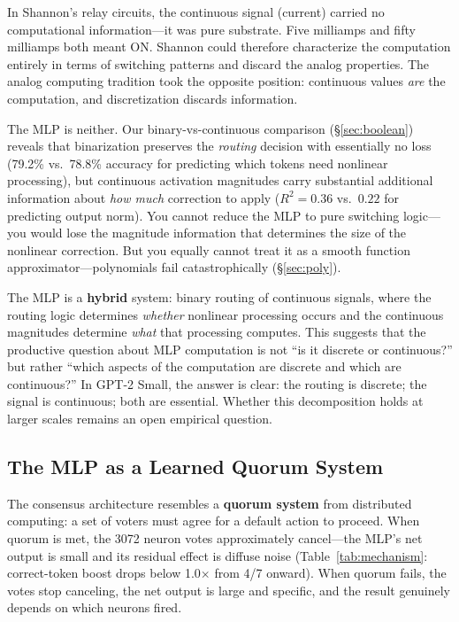 \documentclass{article}
\begin{document}
In Shannon's relay circuits, the continuous signal (current) carried no computational
information---it was pure substrate. Five milliamps and fifty milliamps both meant ON.
Shannon could therefore characterize the computation entirely in terms of switching patterns
and discard the analog properties. The analog computing tradition took the opposite position:
continuous values \emph{are} the computation, and discretization discards information.

The MLP is neither. Our binary-vs-continuous comparison (\S\ref{sec:boolean}) reveals that
binarization preserves the \emph{routing} decision with essentially no loss (79.2\% vs.\
78.8\% accuracy for predicting which tokens need nonlinear processing), but continuous
activation magnitudes carry substantial additional information about \emph{how much}
correction to apply ($R^2 = 0.36$ vs.\ $0.22$ for predicting output norm). You cannot
reduce the MLP to pure switching logic---you would lose the magnitude information that
determines the size of the nonlinear correction. But you equally cannot treat it as a smooth
function approximator---polynomials fail catastrophically (\S\ref{sec:poly}).

The MLP is a \textbf{hybrid} system: binary routing of continuous signals, where the routing
logic determines \emph{whether} nonlinear processing occurs and the continuous magnitudes
determine \emph{what} that processing computes. This suggests that the productive question
about MLP computation is not ``is it discrete or continuous?'' but rather ``which aspects of
the computation are discrete and which are continuous?'' In GPT-2 Small, the answer is clear:
the routing is discrete; the signal is continuous; both are essential. Whether this
decomposition holds at larger scales remains an open empirical question.

\subsection{The MLP as a Learned Quorum System}

The consensus architecture resembles a \textbf{quorum system} from distributed computing: a set
of voters must agree for a default action to proceed. When quorum is met, the 3072 neuron votes
approximately cancel---the MLP's net output is small and its residual effect is diffuse noise
(Table~\ref{tab:mechanism}: correct-token boost drops below 1.0$\times$ from 4/7 onward).
When quorum fails, the votes stop canceling, the net output is
large and specific, and the result genuinely depends on which neurons fired.
\end{document}
